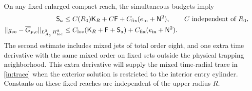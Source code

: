 \begin{proposition}\label{co2:sliced}
On any fixed enlarged compact reach, the simultaneous budgets imply
\begin{align}
 \mathsf S_a&\le C(R_0)\mathsf K_R+C\mathsf F
                   +C_{\rm fix}(e_{\rm in}+\mathsf N^2),
       &&C\text{ independent of }R_0,\label{co2:sliced-acceleration}\\
 \|g_{\rm co}-\overline G_{p,c}\|_{L^2_{A_S}H^8_{\rm loc}}
   &\le C_{\rm loc}(\mathsf K_R+\mathsf F+\mathsf S_a)
                   +C_{\rm fix}(e_{\rm in}+\mathsf N^2).
                    \label{co2:sliced-static}
\end{align}
The second estimate includes mixed jets of total order eight, and one extra
time derivative with the same mixed order on fixed sets outside the physical
trapping neighborhood.  This extra derivative will supply the mixed
time-radial trace in \eqref{in:trace} when the exterior solution is restricted
to the interior entry cylinder.  Constants on these fixed reaches are
independent of the upper radius $R$.
\end{proposition}

